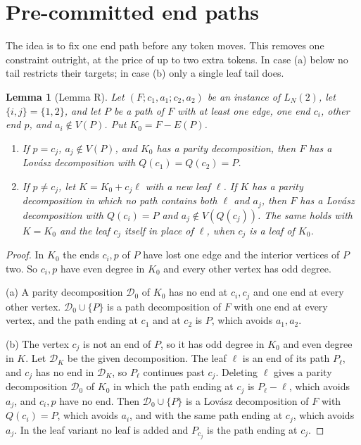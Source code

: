 \documentclass[11pt]{amsart}
\newtheorem{lemma}[theorem]{Lemma}
\theoremstyle{definition}
\newcommand{\cD}{\mathcal D}
\begin{document}
\section{Pre-committed end paths}\label{sec:R}

The idea is to fix one end path before any token moves. This removes one constraint outright, at the
price of up to two extra tokens. In case (a) below no tail restricts their targets; in case (b)
only a single leaf tail does.

\begin{lemma}[Lemma R]\label{lem:R}
Let $(F;c_1,a_1;c_2,a_2)$ be an instance of $L_N(2)$, let $\{i,j\}=\{1,2\}$, and let $P$ be a path
of $F$ with at least one edge, one end $c_i$, other end $p$, and $a_i\notin V(P)$. Put $K_0=F-E(P)$.
\begin{enumerate}[label=(\alph*)]
\item If $p=c_j$, $a_j\notin V(P)$, and $K_0$ has a parity decomposition, then $F$ has a Lov\'asz
decomposition with $Q(c_1)=Q(c_2)=P$.
\item If $p\ne c_j$, let $K=K_0+c_j\ell$ with a new leaf $\ell$. If $K$ has a parity decomposition in
which no path contains both $\ell$ and $a_j$, then $F$ has a Lov\'asz decomposition with $Q(c_i)=P$
and $a_j\notin V(Q(c_j))$. The same holds with $K=K_0$ and the leaf $c_j$ itself in place of $\ell$,
when $c_j$ is a leaf of $K_0$.
\end{enumerate}
\end{lemma}

\begin{proof}
In $K_0$ the ends $c_i,p$ of $P$ have lost one edge and the interior vertices of $P$ two. So $c_i,p$
have even degree in $K_0$ and every other vertex has odd degree.

(a) A parity decomposition $\cD_0$ of $K_0$ has no end at $c_i,c_j$ and one end at every other
vertex. $\cD_0\cup\{P\}$ is a path decomposition of $F$ with one end at every vertex, and the path
ending at $c_1$ and at $c_2$ is $P$, which avoids $a_1,a_2$.

(b) The vertex $c_j$ is not an end of $P$, so it has odd degree in $K_0$ and even degree in $K$.
Let $\cD_K$ be the given decomposition. The leaf $\ell$ is an end of its path $P_\ell$, and $c_j$
has no end in $\cD_K$, so $P_\ell$ continues past $c_j$. Deleting $\ell$ gives a parity decomposition
$\cD_0$ of $K_0$ in which the path ending at $c_j$ is $P_\ell-\ell$, which avoids $a_j$, and $c_i,p$
have no end. Then $\cD_0\cup\{P\}$ is a Lov\'asz decomposition of $F$ with $Q(c_i)=P$, which avoids
$a_i$, and with the same path ending at $c_j$, which avoids $a_j$. In the leaf variant no leaf is
added and $P_{c_j}$ is the path ending at $c_j$.
\end{proof}
\end{document}
